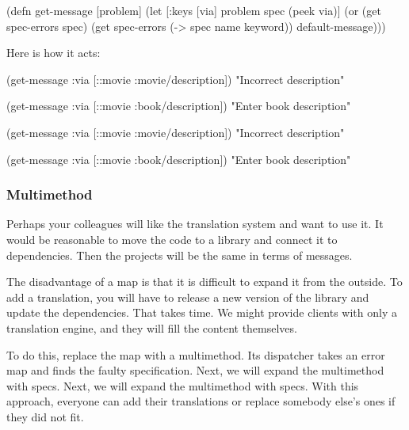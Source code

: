 \begin{english}
  \begin{clojure}
(defn get-message
  [problem]
  (let [{:keys [via]} problem
        spec (peek via)]
    (or (get spec-errors spec)
        (get spec-errors (-> spec name keyword))
        default-message)))
  \end{clojure}
\end{english}

\fi

\noindent
Here is how it acts:

\ifx\DEVICETYPE\MOBILE

  \begin{clojure}
(get-message
  {:via [::movie :movie/description]})
"Incorrect description"

(get-message
  {:via [::movie :book/description]})
"Enter book description"
  \end{clojure}

\else

  \begin{clojure}
(get-message {:via [::movie :movie/description]})
"Incorrect description"

(get-message {:via [::movie :book/description]})
"Enter book description"
  \end{clojure}

\fi

\subsubsection{Multimethod}

Perhaps your colleagues will like the translation system and want to use it. It would be reasonable to move the code to a library and connect it to dependencies. Then the projects will be the same in terms of messages.

The disadvantage of a map is that it is difficult to expand it from the outside. To add a translation, you will have to release a new version of the library and update the dependencies. That takes time. We might provide clients with only a translation engine, and they will fill the content themselves.

To do this, replace the map with a multimethod. Its dispatcher takes an error map and finds the faulty specification. Next, we will expand the multimethod with specs. Next, we will expand the multimethod with specs. With this approach, everyone can add their translations or replace somebody else's ones if they did not fit.

